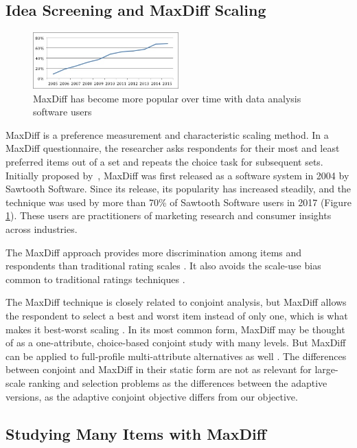\documentclass[a4paper,11pt]{article}
\begin{document}
\subsection{Idea Screening and MaxDiff Scaling}
\begin{figure}
\caption{MaxDiff has become more popular over time with data analysis software users} \label{fig:pop}
\begin{center}
\includegraphics[width=0.5\textwidth]{plots/maxdiffpop}
\end{center}
\end{figure}
MaxDiff is a preference measurement and characteristic scaling method. In a MaxDiff questionnaire, the researcher asks respondents for their most and least preferred items out of a set and repeats the choice task for subsequent sets. Initially proposed by~\cite{louviere1991best}, MaxDiff was first released as a software system in 2004 by Sawtooth Software. Since its release, its popularity has increased steadily, and the technique was used by more than 70\% of Sawtooth Software users in 2017 (Figure \ref{fig:pop}). These users are practitioners of marketing research and consumer insights across industries.

The MaxDiff approach provides more discrimination among items and respondents than traditional rating scales \citep{cohen2004s}. It also avoids the scale-use bias common to traditional ratings techniques \citep{marley2005some,chrzan2006empirical}.

The MaxDiff technique is closely related to conjoint analysis, but MaxDiff allows the respondent to select a best and worst item instead of only one, which is what makes it best-worst scaling \citep{marley2005some}. In its most common form, MaxDiff may be thought of as a one-attribute, choice-based conjoint study with many levels. But MaxDiff can be applied to full-profile multi-attribute alternatives as well \citep{marley2012models}. The differences between conjoint and MaxDiff in their static form are not as relevant for large-scale ranking and selection problems as the differences between the adaptive versions, as the adaptive conjoint objective differs from our objective.

\subsection{Studying Many Items with MaxDiff}
\end{document}
